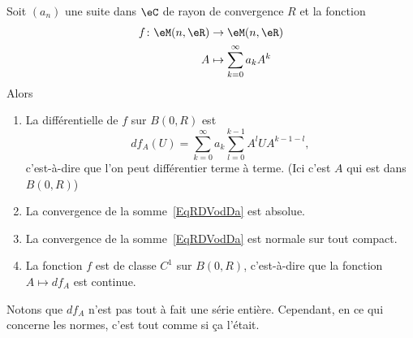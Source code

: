 \begin{proposition} \label{PropAMBXKgV}
    Soit \( (a_n)\) une suite dans \( \eC\) de rayon de convergence \( R\) et la fonction
    \begin{equation}
        \begin{aligned}
            f\colon \eM(n,\eR)&\to \eM(n,\eR) \\
            A&\mapsto \sum_{k=0}^{\infty}a_kA^k
        \end{aligned}
    \end{equation}
    Alors
    \begin{enumerate}
        \item
            La différentielle de \( f\) sur \( B(0,R)\) est
            \begin{equation}    \label{EqRDVodDa}
                df_A(U)=\sum_{k=0}^{\infty}a_k\sum_{l=0}^{k-1}A^lUA^{k-1-l},
            \end{equation}
            c'est-à-dire que l'on peut différentier terme à terme. (Ici c'est \( A\) qui est dans \( B(0,R)\))
        \item
            La convergence de la somme~\ref{EqRDVodDa} est absolue.
        \item
            La convergence de la somme~\ref{EqRDVodDa} est normale sur tout compact.
        \item
            La fonction \( f\) est de classe \( C^1\) sur \( B(0,R)\), c'est-à-dire que la fonction \( A\mapsto df_A\) est continue.
    \end{enumerate}
\end{proposition}
Notons que \( df_A\) n'est pas tout à fait une série entière. Cependant, en ce qui concerne les normes, c'est tout comme si ça l'était.

